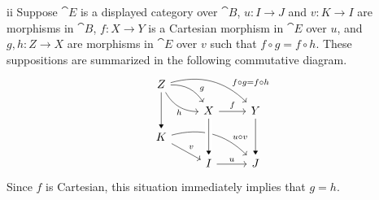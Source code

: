 \begin{partsolution}{ii}
Suppose \(\cat{E}\) is a displayed category over \(\cat{B}\), \(u : I \to J\) and \(v : K \to I\) are morphisms in \(\cat{B}\), \(f : X \to Y\) is a Cartesian morphism in \(\cat{E}\) over \(u\), and \(g, h : Z \to X\) are morphisms in \(\cat{E}\) over \(v\) such that \(f \circ g = f \circ h\).
These suppositions are summarized in the following commutative diagram.
\begin{equation*}
\begin{tikzcd}[row sep=small]
Z \arrow[rd, bend left, near end, "g"] \arrow[rd, bend right, "h"{below}] \arrow[dd, -Triangle] \arrow[rrd, bend left, near end, "f \circ g = f \circ h"] \\
& X \arrow[dd, -Triangle] \arrow[r, "f"] & Y \arrow[dd, -Triangle] \\
K \arrow[rd, "v"] \arrow[rrd, bend left, near end, "u \circ v"] \\
& I \arrow[r, "u"] & J
\arrow[from=uul, to=l, -Triangle, crossing over]
\end{tikzcd}
\end{equation*}
Since \(f\) is Cartesian, this situation immediately implies that \(g = h\).
\end{partsolution}
